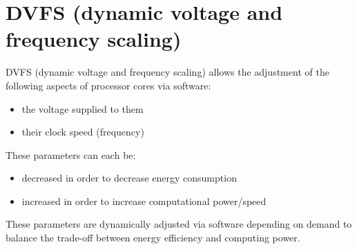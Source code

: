 \section{DVFS (dynamic voltage and frequency scaling)}

DVFS (dynamic voltage and frequency scaling) allows the adjustment of the
following aspects of processor cores via software:
\begin{itemize}
    \item the voltage supplied to them
    \item their clock speed (frequency)
\end{itemize}
These parameters can each be:
\begin{itemize}
    \item decreased in order to decrease energy consumption
    \item increased in order to increase computational power/speed
\end{itemize}
These parameters are dynamically adjusted via software depending on demand to
balance the trade-off between energy efficiency and computing power.

